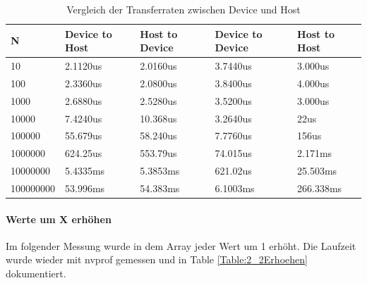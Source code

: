 \documentclass{report}
\begin{document}
\begin{table}
	\begin{tabular}{|l|l|l|l|l|}
		\hline
		N         & Device to Host     & Host to Device     & Device to Device     & Host to Host      \\ \hline \hline
		10			& 2.1120us & 2.0160us &  3.7440us & 3.000us \\ \hline
		100			& 2.3360us & 2.0800us  & 3.8400us & 4.000us\\ \hline
		1000	& 2.6880us & 2.5280us & 3.5200us & 3.000us \\ \hline 
		10000     & 7.4240us & 10.368us & 3.2640us & 22us      \\ \hline
		100000    & 55.679us & 58.240us & 7.7760us & 156us     \\ \hline
		1000000   & 624.25us & 553.79us & 74.015us & 2.171ms   \\ \hline
		10000000  & 5.4335ms & 5.3853ms & 621.02us & 25.503ms  \\ \hline
		100000000 & 53.996ms & 54.383ms & 6.1003ms & 266.338ms \\ \hline
	\end{tabular}
	\caption{Vergleich der Transferraten zwischen Device und Host}
	\label{Table:2_2Groesse}
\end{table}

\paragraph{Werte um X erhöhen} Im folgender Messung wurde in dem Array jeder Wert um 1 erhöht. Die Laufzeit wurde wieder mit nvprof gemessen und in Table \ref{Table:2_2Erhoehen} dokumentiert.
\end{document}
